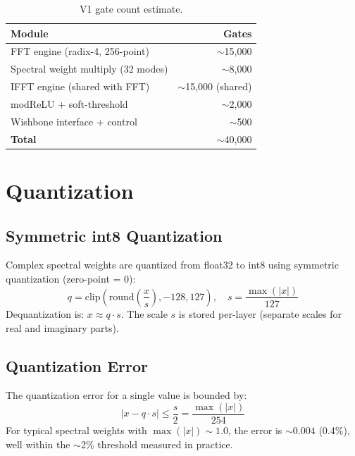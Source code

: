\documentclass[11pt,a4paper]{article}
\theoremstyle{definition}
\theoremstyle{remark}
\newcommand{\abs}[1]{\left\lvert#1\right\rvert}
\begin{document}
\begin{table}[h]
\centering
\caption{V1 gate count estimate.}
\label{tab:gates_v1}
\begin{tabular}{lr}
\toprule
\textbf{Module} & \textbf{Gates} \\
\midrule
FFT engine (radix-4, 256-point) & $\sim$15{,}000 \\
Spectral weight multiply (32 modes) & $\sim$8{,}000 \\
IFFT engine (shared with FFT) & $\sim$15{,}000 (shared) \\
modReLU + soft-threshold & $\sim$2{,}000 \\
Wishbone interface + control & $\sim$500 \\
\midrule
\textbf{Total} & $\sim$40{,}000 \\
\bottomrule
\end{tabular}
\end{table}

\section{Quantization}

\subsection{Symmetric int8 Quantization}

Complex spectral weights are quantized from float32 to int8 using symmetric
quantization (zero-point = 0):
\begin{equation}
  q = \text{clip}\!\left( \text{round}\!\left( \frac{x}{s} \right), -128, 127 \right), \quad
  s = \frac{\max(\abs{x})}{127}
  \label{eq:quant}
\end{equation}
Dequantization is: $x \approx q \cdot s$. The scale $s$ is stored per-layer
(separate scales for real and imaginary parts).

\subsection{Quantization Error}

The quantization error for a single value is bounded by:
\begin{equation}
  \abs{x - q \cdot s} \leq \frac{s}{2} = \frac{\max(\abs{x})}{254}
\end{equation}
For typical spectral weights with $\max(\abs{x}) \sim 1.0$, the error is
$\sim 0.004$ (0.4\%), well within the $\sim$2\% threshold measured in practice.
\end{document}
